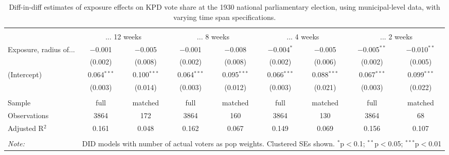 
\begin{table}[!htbp] \centering 
  \caption{Diff-in-diff estimates of exposure effects on KPD vote share at the 1930 national parliamentary election, using municipal-level data, with varying time span specifications.\vspace{-.25cm}} 
  \label{tab:voteshare-kpd-timespan-dd-1930comm} 
\scriptsize 
\begin{tabular}{@{\extracolsep{5pt}}lcccccccc} 
\\[-1.8ex]\hline 
\hline \\[-1.8ex] 
 & \multicolumn{2}{c}{... 12 weeks} & \multicolumn{2}{c}{... 8 weeks} & \multicolumn{2}{c}{... 4 weeks} & \multicolumn{2}{c}{... 2 weeks} \\ 
 \cmidrule(r){2-3}\cmidrule(r){4-5}\cmidrule(r){6-7}\cmidrule(r){8-9}Exposure, radius of... & $-$0.001 & $-$0.005 & $-$0.001 & $-$0.008 & $-$0.004$^{*}$ & $-$0.005 & $-$0.005$^{**}$ & $-$0.010$^{**}$ \\ 
  & (0.002) & (0.008) & (0.002) & (0.008) & (0.002) & (0.006) & (0.002) & (0.005) \\ 
  (Intercept) & 0.064$^{***}$ & 0.100$^{***}$ & 0.064$^{***}$ & 0.095$^{***}$ & 0.066$^{***}$ & 0.088$^{***}$ & 0.067$^{***}$ & 0.099$^{***}$ \\ 
  & (0.003) & (0.014) & (0.003) & (0.012) & (0.003) & (0.021) & (0.003) & (0.022) \\ 
 \hline \\[-1.8ex] 
Sample & full & matched & full & matched & full & matched & full & matched \\ 
Observations & 3864 & 172 & 3864 & 160 & 3864 & 130 & 3864 & 68 \\ 
Adjusted R$^{2}$ & 0.161 & 0.048 & 0.162 & 0.067 & 0.149 & 0.069 & 0.156 & 0.107 \\ 
\hline 
\hline \\[-1.8ex] 
\textit{Note:}  & \multicolumn{8}{r}{DID models with number of actual voters as pop weights. Clustered SEs shown. $^{*}$p$<$0.1; $^{**}$p$<$0.05; $^{***}$p$<$0.01} \\ 
\end{tabular} 
\end{table} 

